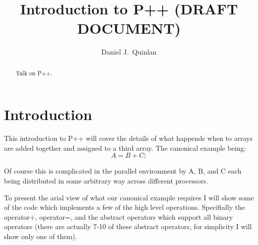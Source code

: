 \documentclass[10pt]{llncs}
\begin{document}
\title{ Introduction to P++ (DRAFT DOCUMENT) }
\author{Daniel J.\ Quinlan }

\date{}

\maketitle

\begin{abstract}
   Talk on P++.
\end{abstract}


\section{Introduction}

    This introduction to P++ will cover the details of what happends when to arrays are added together
and assigned to a third array.  The canonical example being: 
$$ A = B + C; $$

Of course this is complicated in the parallel environment by A, B, and C each being distributed in some
arbitrary way across different processors.

To present the arial view of what our canonical example requires I will show some of the code which
implements a few of the high level operations. Specifially the operator+, operator=, and the
abstract operators which support all binary operators (there are actually 7-10 of these abstract
operators, for simplicity I will show only one of them).
\end{document}
